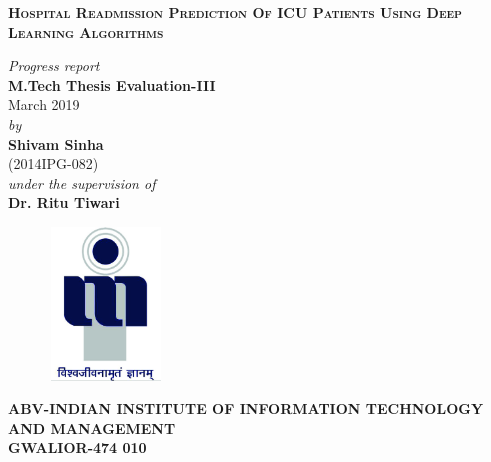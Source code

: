 \documentclass[12pt,a4paper]{article}
\begin{document}
\thispagestyle{empty}
\begin{titlepage}
\begin{center}
\textsc{\Large \textbf{Hospital Readmission Prediction Of ICU Patients Using Deep Learning Algorithms }}\\[1.2cm]
\end{center}
\begin{center}
\vspace{0.1in}
{\Large \it Progress report} \\
\vspace{0.3in}
{\Large \bf M.Tech Thesis Evaluation-III} \\
March 2019\\
\vspace{0.3in}
{\large \it by\\}
\vspace{0.2in}
{\Large \bf Shivam Sinha}\\
\vspace{0.2in}
{\Large (2014IPG-082)}\\
\vspace{0.4in}
{\large \it under the supervision of\\}
\vspace{0.3in}
{\Large \bf Dr. Ritu Tiwari}\\
\end {center}
\vspace{0.2in}
\begin{figure}[h]
\centerline{\includegraphics[width=1.2in,height=1.6in]{iiitm}}
\end{figure}
\vspace{0.1in}
\begin{center}
{\Large \bf ABV-INDIAN INSTITUTE OF INFORMATION TECHNOLOGY AND MANAGEMENT\\
GWALIOR-474 010\\}
\end{center}
\end{titlepage}
\end{document}
